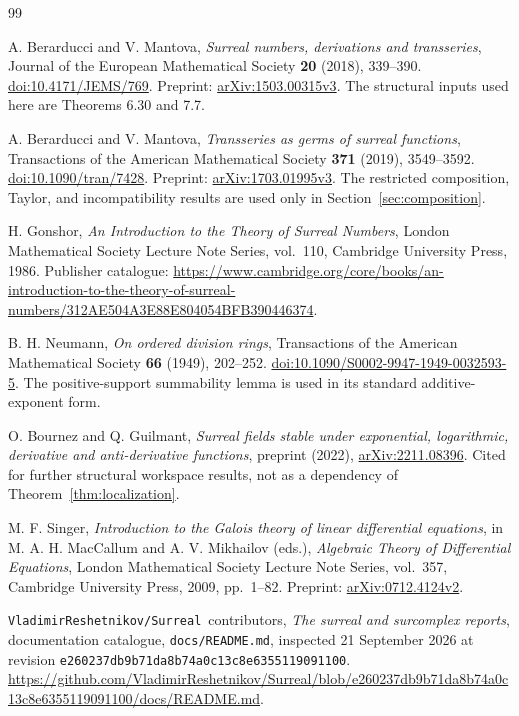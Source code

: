 \documentclass[11pt,a4paper]{article}
\numberwithin{equation}{section}
\theoremstyle{definition}
\theoremstyle{remark}
\newcommand{\repo}{\texttt{VladimirReshetnikov/Surreal}}
\newcommand{\arxiv}[1]{\href{https://arxiv.org/abs/#1}{arXiv:#1}}
\newcommand{\code}[1]{\texttt{#1}}
\begin{document}
\clearpage
\begin{thebibliography}{99}\raggedright
{}
\small

A. Berarducci and V. Mantova,
\emph{Surreal numbers, derivations and transseries},
Journal of the European Mathematical Society \textbf{20} (2018), 339--390.
\href{https://doi.org/10.4171/JEMS/769}{doi:10.4171/JEMS/769}.
Preprint: \arxiv{1503.00315v3}.
The structural inputs used here are Theorems 6.30 and 7.7.

A. Berarducci and V. Mantova,
\emph{Transseries as germs of surreal functions},
Transactions of the American Mathematical Society \textbf{371} (2019),
3549--3592.
\href{https://doi.org/10.1090/tran/7428}{doi:10.1090/tran/7428}.
Preprint: \arxiv{1703.01995v3}.
The restricted composition, Taylor, and incompatibility results are used
only in Section~\ref{sec:composition}.

H. Gonshor,
\emph{An Introduction to the Theory of Surreal Numbers},
London Mathematical Society Lecture Note Series, vol.~110,
Cambridge University Press, 1986.
Publisher catalogue:
\url{https://www.cambridge.org/core/books/an-introduction-to-the-theory-of-surreal-numbers/312AE504A3E88E804054BFB390446374}.

B. H. Neumann,
\emph{On ordered division rings},
Transactions of the American Mathematical Society \textbf{66} (1949),
202--252.
\href{https://doi.org/10.1090/S0002-9947-1949-0032593-5}{doi:10.1090/S0002-9947-1949-0032593-5}.
The positive-support summability lemma is used in its standard
additive-exponent form.

O. Bournez and Q. Guilmant,
\emph{Surreal fields stable under exponential, logarithmic, derivative and
anti-derivative functions}, preprint (2022), \arxiv{2211.08396}.
Cited for further structural workspace results, not as a dependency of
Theorem~\ref{thm:localization}.

M. F. Singer,
\emph{Introduction to the Galois theory of linear differential equations},
in M. A. H. MacCallum and A. V. Mikhailov (eds.),
\emph{Algebraic Theory of Differential Equations},
London Mathematical Society Lecture Note Series, vol.~357,
Cambridge University Press, 2009, pp.~1--82.
Preprint: \arxiv{0712.4124v2}.

\repo\ contributors,
\emph{The surreal and surcomplex reports}, documentation catalogue,
\code{docs/README.md}, inspected 21 September 2026 at revision
\code{e260237db9b71da8b74a0c13c8e6355119091100}.
\url{https://github.com/VladimirReshetnikov/Surreal/blob/e260237db9b71da8b74a0c13c8e6355119091100/docs/README.md}.


\end{thebibliography}
\end{document}
